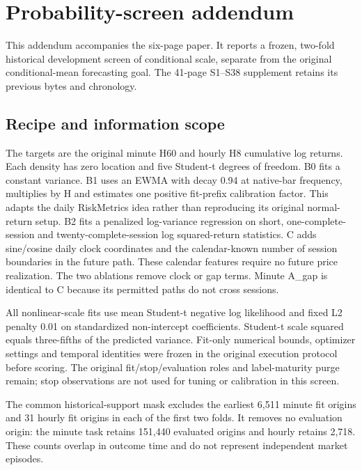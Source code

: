 \documentclass[10pt,a4paper]{article}
\begin{document}
\section{Probability-screen addendum}\label{probability-screen-addendum}

This addendum accompanies the six-page paper. It reports a frozen, two-fold historical development screen of conditional scale, separate from the original conditional-mean forecasting goal. The 41-page S1--S38 supplement retains its previous bytes and chronology.

\subsection{Recipe and information scope}\label{recipe-and-information-scope}

The targets are the original minute H60 and hourly H8 cumulative log returns. Each density has zero location and five Student-t degrees of freedom. B0 fits a constant variance. B1 uses an EWMA with decay 0.94 at native-bar frequency, multiplies by H and estimates one positive fit-prefix calibration factor. This adapts the daily RiskMetrics idea rather than reproducing its original normal-return setup. B2 fits a penalized log-variance regression on short, one-complete-session and twenty-complete-session log squared-return statistics. C adds sine/cosine daily clock coordinates and the calendar-known number of session boundaries in the future path. These calendar features require no future price realization. The two ablations remove clock or gap terms. Minute A\_gap is identical to C because its permitted paths do not cross sessions.

All nonlinear-scale fits use mean Student-t negative log likelihood and fixed L2 penalty 0.01 on standardized non-intercept coefficients. Student-t scale squared equals three-fifths of the predicted variance. Fit-only numerical bounds, optimizer settings and temporal identities were frozen in the original execution protocol before scoring. The original fit/stop/evaluation roles and label-maturity purge remain; stop observations are not used for tuning or calibration in this screen.

The common historical-support mask excludes the earliest 6,511 minute fit origins and 31 hourly fit origins in each of the first two folds. It removes no evaluation origin: the minute task retains 151,440 evaluated origins and hourly retains 2,718. These counts overlap in outcome time and do not represent independent market episodes.
\end{document}
